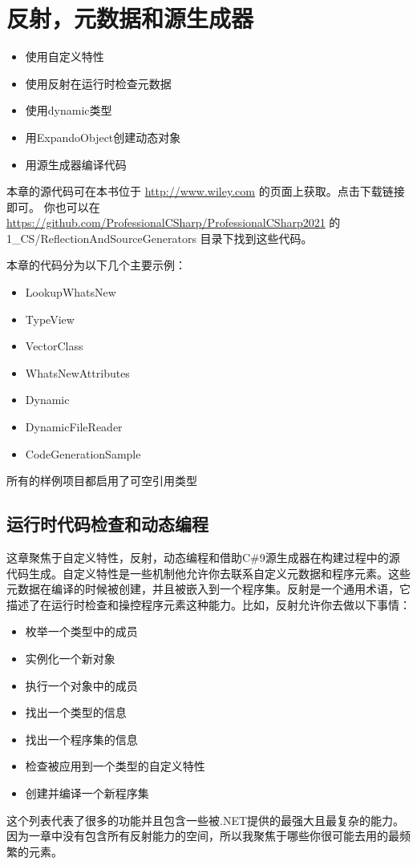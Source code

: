 \chapter{反射，元数据和源生成器}
\underline{}
\begin{itemize}
    \item 使用自定义特性
    \item 使用反射在运行时检查元数据
    \item 使用dynamic类型
    \item 用ExpandoObject创建动态对象
    \item 用源生成器编译代码
\end{itemize}

\underline{}

本章的源代码可在本书位于 \url{http://www.wiley.com} 的页面上获取。点击下载链接即可。
你也可以在 \url{https://github.com/ProfessionalCSharp/ProfessionalCSharp2021} 的 1\_CS/ReflectionAndSourceGenerators 目录下找到这些代码。

本章的代码分为以下几个主要示例：
\begin{itemize}
    \item LookupWhatsNew
    \item TypeView
    \item VectorClass
    \item WhatsNewAttributes
    \item Dynamic
    \item DynamicFileReader
    \item CodeGenerationSample
\end{itemize}
所有的样例项目都启用了可空引用类型

\section{运行时代码检查和动态编程}
这章聚焦于自定义特性，反射，动态编程和借助C\#9源生成器在构建过程中的源代码生成。自定义特性是一些机制他允许你去联系自定义元数据和程序元素。这些元数据在编译的时候被创建，并且被嵌入到一个程序集。反射是一个通用术语，它描述了在运行时检查和操控程序元素这种能力。比如，反射允许你去做以下事情：
\begin{itemize}
    \item 枚举一个类型中的成员
    \item 实例化一个新对象
    \item 执行一个对象中的成员
    \item 找出一个类型的信息
    \item 找出一个程序集的信息
    \item 检查被应用到一个类型的自定义特性
    \item 创建并编译一个新程序集
\end{itemize}
这个列表代表了很多的功能并且包含一些被.NET提供的最强大且最复杂的能力。因为一章中没有包含所有反射能力的空间，所以我聚焦于哪些你很可能去用的最频繁的元素。

